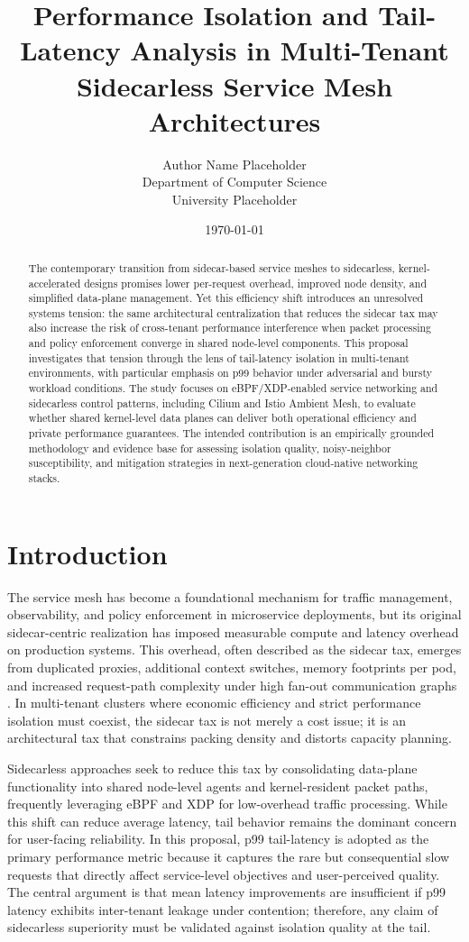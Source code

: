 \documentclass[12pt,a4paper]{article}
\title{Performance Isolation and Tail-Latency Analysis in Multi-Tenant Sidecarless Service Mesh Architectures}
\author{Author Name Placeholder\\
Department of Computer Science\\
University Placeholder}
\date{\today}
\begin{document}
\maketitle

\begin{abstract}
The contemporary transition from sidecar-based service meshes to sidecarless, kernel-accelerated designs promises lower per-request overhead, improved node density, and simplified data-plane management. Yet this efficiency shift introduces an unresolved systems tension: the same architectural centralization that reduces the sidecar tax may also increase the risk of cross-tenant performance interference when packet processing and policy enforcement converge in shared node-level components. This proposal investigates that tension through the lens of tail-latency isolation in multi-tenant environments, with particular emphasis on p99 behavior under adversarial and bursty workload conditions. The study focuses on eBPF/XDP-enabled service networking and sidecarless control patterns, including Cilium and Istio Ambient Mesh, to evaluate whether shared kernel-level data planes can deliver both operational efficiency and private performance guarantees. The intended contribution is an empirically grounded methodology and evidence base for assessing isolation quality, noisy-neighbor susceptibility, and mitigation strategies in next-generation cloud-native networking stacks.
\end{abstract}

\section{Introduction}
The service mesh has become a foundational mechanism for traffic management, observability, and policy enforcement in microservice deployments, but its original sidecar-centric realization has imposed measurable compute and latency overhead on production systems. This overhead, often described as the sidecar tax, emerges from duplicated proxies, additional context switches, memory footprints per pod, and increased request-path complexity under high fan-out communication graphs \cite{envoyDataPlaneOverhead,serviceMeshPerfStudies}. In multi-tenant clusters where economic efficiency and strict performance isolation must coexist, the sidecar tax is not merely a cost issue; it is an architectural tax that constrains packing density and distorts capacity planning.

Sidecarless approaches seek to reduce this tax by consolidating data-plane functionality into shared node-level agents and kernel-resident packet paths, frequently leveraging eBPF and XDP for low-overhead traffic processing. While this shift can reduce average latency, tail behavior remains the dominant concern for user-facing reliability. In this proposal, p99 tail-latency is adopted as the primary performance metric because it captures the rare but consequential slow requests that directly affect service-level objectives and user-perceived quality. The central argument is that mean latency improvements are insufficient if p99 latency exhibits inter-tenant leakage under contention; therefore, any claim of sidecarless superiority must be validated against isolation quality at the tail.
\end{document}

